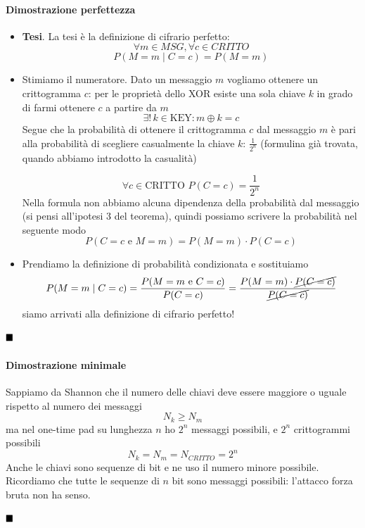 \paragraph{Dimostrazione perfettezza}
\begin{itemize}
	\item \textbf{Tesi}. La tesi è la definizione di cifrario perfetto:
	$$ \forall m \in MSG, \forall c \in CRITTO $$
	$$ P(M=m \mid C=c) = P(M=m) $$
	\item Stimiamo il numeratore. Dato un messaggio $m$ vogliamo ottenere un crittogramma $c$: per le proprietà dello XOR esiste una sola chiave $k$ in grado di farmi ottenere $c$ a partire da $m$
	$$ \exists! \, k \in \text{KEY}: m \oplus k = c $$
	Segue che la probabilità di ottenere il crittogramma $c$ dal messaggio $m$ è pari alla probabilità di scegliere casualmente la chiave $k$: $\frac{1}{2^n}$ (formulina già trovata, quando abbiamo introdotto la casualità)

	$$\forall c \in \text{CRITTO}\,\,P(C=c)=\frac{1}{2^n}$$
	Nella formula non abbiamo alcuna dipendenza della probabilità dal messaggio (si pensi all'ipotesi 3 del teorema), quindi possiamo scrivere la probabilità nel seguente modo
	$$ P(C=c\text{ e }M=m) = P(M=m) \cdot P(C=c) $$
	\item Prendiamo la definizione di probabilità condizionata e sostituiamo
	$$
	P(M=m \mid C=c) = \frac{P(M=m\text{ e }C=c)}{P(C=c)} = \frac{P(M=m) \cdot \cancel{P(C=c)}}{\cancel{P(C=c)}}
	$$
	siamo arrivati alla definizione di cifrario perfetto!
\end{itemize}
$\hfill\blacksquare$






\paragraph{Dimostrazione minimale}
Sappiamo da Shannon che il numero delle chiavi deve essere maggiore o uguale rispetto al numero dei messaggi $$N_k \geq N_m$$ ma nel one-time pad su lunghezza $n$ ho $2^n$ messaggi possibili, e $2^n$ crittogrammi possibili
$$N_k = N_m= N_{CRITTO} = 2^n$$
Anche le chiavi sono sequenze di bit e ne uso il numero minore possibile. Ricordiamo che tutte le sequenze di $n$ bit sono messaggi possibili: l'attacco forza bruta non ha senso.

$\hfill\blacksquare$


